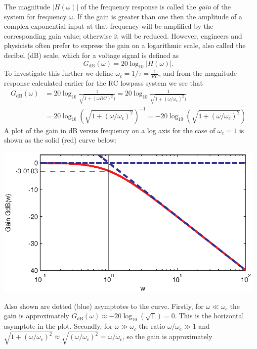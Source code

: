 \documentclass[10pt]{beamer}
\begin{document}
The magnitude $|H(\omega)|$ of the frequency response is called the {\em gain} of the system for frequency $\omega$.  If the gain is greater than one then the amplitude of a complex exponential input at that frequency will be amplified by the corresponding gain value; otherwise it will be reduced.  However, engineers and physicists often prefer to express the gain on a logarithmic scale, also called the decibel (dB) scale, which for a voltage signal is defined as
\begin{equation*}
  G_{\text{dB}}(\omega) = 20 \log_{10} |H(\omega)|.
\end{equation*}
To investigate this further we define $\omega_c = 1/\tau = \frac{1}{RC}$, and from the magnitude response calculated earlier for the RC lowpass system we see that
\begin{align*}
  G_{\text{dB}}(\omega) &= 20 \log_{10} \frac{1}{\sqrt{1 + (\omega RC)^2})}
  = 20 \log_{10} \frac{1}{\sqrt{1 + (\omega/\omega_c)^2})} \\
  &= 20 \log_{10} (\sqrt{1 + (\omega/\omega_c)^2})^{-1} 
  = -20 \log_{10} (\sqrt{1 + (\omega/\omega_c)^2})
\end{align*}
A plot of the gain in dB versus frequency on a log axis for the case of $\omega_c = 1$ is shown as the solid (red) curve below:
\begin{center}
  \includegraphics{rclpfbodemag}
\end{center}
Also shown are dotted (blue) asymptotes to the curve.  Firstly, for $\omega \ll \omega_c$ the gain is approximately $G_{\text{dB}}(\omega) \approx -20 \log_{10} (\sqrt{1}) = 0$.  This is the horizontal asymptote in the plot.  Secondly, for $\omega \gg \omega_c$ the ratio $\omega/\omega_c \gg 1$ and $\sqrt{1 + (\omega/\omega_c)^2} \approx \sqrt{(\omega/\omega_c)^2} = \omega/\omega_c$, so the gain is approximately
\end{document}
